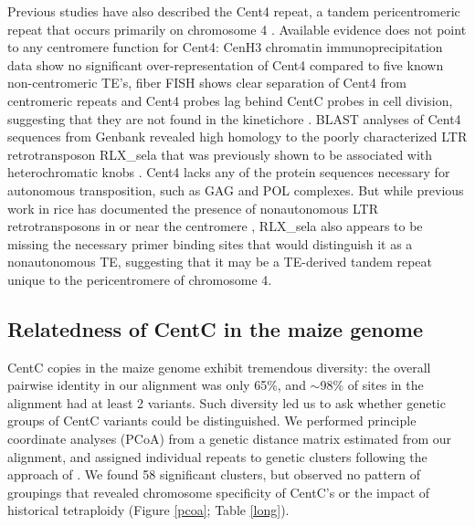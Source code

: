 Previous studies have also described the Cent4 repeat, a tandem pericentromeric repeat that occurs primarily on chromosome 4 \citep{Page2001}. 
Available evidence does not point to any centromere function for Cent4: CenH3 chromatin immunoprecipitation data \citep{Wolfgruber2009, jin2004maize} show no significant over-representation of Cent4 compared to five known non-centromeric TE’s, fiber FISH shows clear separation of Cent4 from centromeric repeats \citep{jin2004maize} and Cent4 probes lag behind CentC probes in cell division, suggesting that they are not found in the kinetichore \citep{Jiang2002, jin2004maize}. 
BLAST analyses of Cent4 sequences from Genbank revealed high homology to the poorly characterized LTR retrotransposon RLX\_sela that was previously shown to be associated with heterochromatic  knobs \citep{Tenaillon2011, Chia2012}.  
Cent4 lacks any of the protein sequences necessary for autonomous transposition, such as GAG and POL complexes.  
But while previous work in rice has documented the presence of nonautonomous LTR retrotransposons  in or near the centromere \citep{Jiang2002}, RLX\_sela also appears to be missing the necessary primer binding sites that would distinguish it as a nonautonomous TE, suggesting that it may be a TE-derived tandem repeat unique to the pericentromere of chromosome 4. 

\subsection*{Relatedness of CentC in the maize genome}

CentC copies in the maize genome exhibit tremendous diversity: the overall pairwise identity in our alignment was only 65\%, and $\sim$98\% of sites in the alignment had at least 2 variants.  Such diversity led us to ask whether genetic groups of CentC variants could be distinguished. We performed principle coordinate analyses (PCoA) from a genetic distance matrix estimated from our alignment, and assigned individual repeats to  genetic clusters following the approach of \citet{Patterson2006}.  We found 58 significant clusters, but observed no pattern of groupings that revealed chromosome specificity of CentC’s or the impact of historical tetraploidy (Figure \ref{pcoa}; Table \ref{long}).

